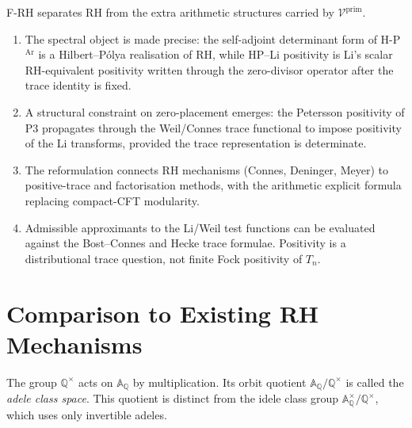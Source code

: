 \begin{remark}
\label{v4-arith:rh:rem:what-is-gained}
F-RH separates RH from the extra arithmetic structures carried by
\(\mathcal{V}^{\mathrm{prim}}\).
\begin{enumerate}
\item The spectral object is made precise: the self-adjoint
determinant form of H-P\(^{\mathrm{Ar}}\) is a Hilbert--P\'olya
realisation of RH, while HP--Li positivity is Li's scalar
RH-equivalent positivity written through the zero-divisor operator after the
trace identity is fixed.
\item A structural constraint on zero-placement emerges: the
Petersson positivity of P3 propagates through the Weil/Connes trace
functional to impose positivity of the Li transforms, provided
the trace representation is determinate.
\item The reformulation connects RH mechanisms (Connes, Deninger,
Meyer) to positive-trace and factorisation methods, with the
arithmetic explicit formula replacing compact-CFT modularity.
\item Admissible approximants to the Li/Weil test functions can be
evaluated against the Bost--Connes and Hecke trace formulae.
Positivity is a
distributional trace question, not finite Fock positivity of
\(T_{n}\).
\end{enumerate}
\end{remark}

\section{Comparison to Existing RH Mechanisms}
\label{v4-arith:rh:comparison}

The group \(\mathbb Q^\times\) acts on \(\mathbb A_{\mathbb Q}\)
by multiplication. Its orbit quotient
\(\mathbb A_{\mathbb Q}/\mathbb Q^\times\) is called the
\emph{adele class space}. This quotient is distinct from the idele
class group \(\mathbb A_{\mathbb Q}^\times/\mathbb Q^\times\),
which uses only invertible adeles.

